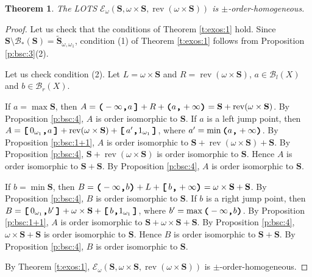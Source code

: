 \documentclass[preprint]{elsarticle}
\def\om{\omega}
\def\cB{\mathcal{B}}
\def\cE{\mathcal{E}}
\def\cB{{\mathcal B}}
\def\cB{{\mathcal B}}
\def\wt#1{\widetilde{#1}}
\newtheorem{theorem}{Theorem}[section]
\theoremstyle{definition}
\theoremstyle{remark}
\def\rev{\operatorname{rev}}
\def\ilcomma/{\boldsymbol{,}}
\def\ilsymlp{\boldsymbol{(}}
\def\ilsymrp{\boldsymbol{)}}
\def\ilsymlc{\boldsymbol{[}}
\def\ilsymrc{\boldsymbol{]}}
\def\ilfont#1{\boldsymbol{#1}}
\def\ilfontX#1{\mathrm{\text{\texttt{\textbf{\large #1}}}}}
\def\ilfontX#1{{\text{\texttt{\textbf{\large \upshape #1}}}}}
\def\ilfont#1{\raisebox{-1.2pt}{\ilfontX{#1}}}
\def\ilfontC#1{\raisebox{-0.7pt}{\ilfontX{#1}}}
\def\ilcomma/{\ilfontC{,}}
\def\ilsymlp{\ilfont{(}}
\def\ilsymrp{\ilfont{)}}
\def\ilsymlc{\ilfont{[}\,}
\def\ilsymrc{\,\ilfont{]}}
\def\ilpp(#1,#2){\ilsymlp#1\ilcomma/ #2\ilsymrp}
\def\ilcp[#1,#2){\ilsymlc#1\ilcomma/ #2\ilsymrp}
\def\ilpc(#1,#2]{\ilsymlp#1\ilcomma/ #2\ilsymrc}
\def\ilcc[#1,#2]{\ilsymlc#1\ilcomma/ #2\ilsymrc}
\def\sS{\mathbf{S}}
\def\wS{\wt\sS}
\def\mns{0_{\om_1}}
\def\mxs{1_{\om_1}}
\def\er{\cB_r}
\def\el{\cB_l}
\def\ea{\cB_*}
\def\ex{\cE}
\begin{document}
\begin{theorem}\label{t:bsc:1}
The LOTS $\ex_\om(\sS, \om\times \sS, \rev(\om\times \sS))$ is $\pm$-order-homogeneous.
\end{theorem}
\begin{proof}
Let us check that the conditions of Theorem \ref{t:exos:1} hold. Since $\sS\setminus \ea(\sS)=\wS_{\om,\om_1}$, condition (1) of Theorem \ref{t:exos:1} follows from Proposition \ref{p:bsc:3}(2).


Let us check condition (2). Let $L=\om\times \sS$ and $R=\rev(\om\times \sS)$, $a\in \el(X)$ and $b\in \er(X)$.

If $a=\max \sS$, then $A=\ilpc(-\infty,a] + R + \ilpp(a,+\infty)=\sS + \rev(\om\times \sS)$. By Proposition \ref{p:bsc:4}, $A$ is order isomorphic to $\sS$. If $a$ is a left jump point, then $A= \ilcc[\mns,a] + \rev(\om\times \sS) + \ilcc[a',\mxs]$, where $a'=\min \ilpp(a,+\infty)$. By Proposition \ref{p:bsc:1+1}, $A$ is order isomorphic to $\sS + \rev(\om\times \sS) + \sS$. By Proposition \ref{p:bsc:4}, $\sS + \rev(\om\times \sS)$ is order isomorphic to $\sS$. Hence $A$ is order isomorphic to $\sS + \sS$. By Proposition \ref{p:bsc:4}, $A$ is order isomorphic to $\sS$.

If $b=\min \sS$, then $B=\ilpp(-\infty,b) + L + \ilcp[b,+\infty)=\om\times \sS + \sS$. By Proposition \ref{p:bsc:4}, $B$ is order isomorphic to $\sS$. If $b$ is a right jump point, then $B= \ilcc[\mns,b'] + \om\times \sS + \ilcc[b,\mxs]$, where $b'=\max \ilpp(-\infty,b)$. By Proposition \ref{p:bsc:1+1}, $A$ is order isomorphic to $\sS + \om\times \sS + \sS$. By Proposition \ref{p:bsc:4}, $\om\times \sS+\sS$ is order isomorphic to $\sS$. Hence $B$ is order isomorphic to $\sS + \sS$. By Proposition \ref{p:bsc:4}, $B$ is order isomorphic to $\sS$.

By Theorem \ref{t:exos:1}, $\ex_\om(\sS, \om\times \sS, \rev(\om\times \sS))$ is $\pm$-order-homogeneous.
\end{proof}
























\end{document}
